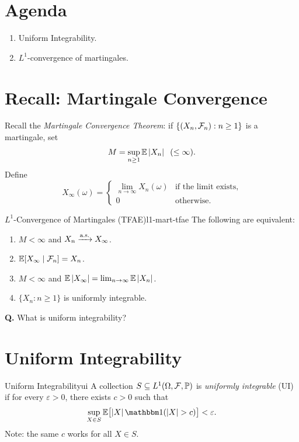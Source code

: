 
\section{Agenda}
\begin{enumerate}
    \item Uniform Integrability.
    \item $L^1$-convergence of martingales.
\end{enumerate}

\section{Recall: Martingale Convergence}

Recall the \emph{Martingale Convergence Theorem}: if $\{(X_n, \mathcal{F}_n) : n \geq 1\}$ is a martingale, set
\[
    M = \sup_{n \geq 1} \mathbb{E}\left|X_n\right| \;\;(\leq \infty).
\]
Define
\[
    X_\infty(\omega) =
    \begin{cases}
        \lim_{n \to \infty} X_n(\omega) & \text{if the limit exists},\\
        0 & \text{otherwise}.
    \end{cases}
\]

\begin{theorem}{$L^1$-Convergence of Martingales (TFAE)}{l1-mart-tfae}
    The following are equivalent:
    \begin{enumerate}[label=(\roman*)]
        \item $M < \infty$ and $X_n \xrightarrow{\text{a.s.}} X_\infty$.
        \item $\mathbb{E}[X_\infty \mid \mathcal{F}_n] = X_n$.
        \item $M < \infty$ and $\mathbb{E}\left|X_\infty\right| = \lim_{n \to \infty} \mathbb{E}\left|X_n\right|$.
        \item $\{X_n : n \geq 1\}$ is uniformly integrable.
    \end{enumerate}
\end{theorem}

\textbf{Q.} What is uniform integrability?

\section{Uniform Integrability}

\begin{definition}{Uniform Integrability}{ui}
    A collection $S \subseteq L^1(\Omega, \mathcal{F}, \mathbb{P})$ is \emph{uniformly integrable} (UI) if for every $\varepsilon > 0$, there exists $c > 0$ such that
    \[
        \sup_{X \in S} \E\bigl[\abs{X} \ind(\abs{X} > c)\bigr] < \varepsilon.
    \]
    Note: the same $c$ works for all $X \in S$.
\end{definition}

